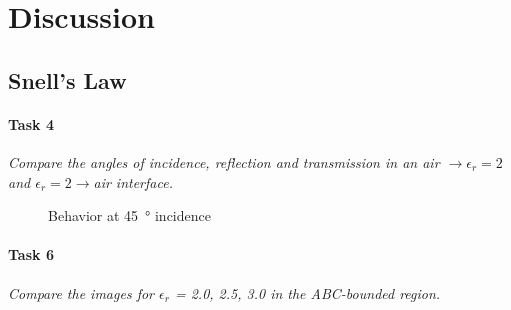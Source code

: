 \section{Discussion}\label{sec:discussion}
\subsection{Snell's Law}
\paragraph{Task 4}\textit{Compare the angles of incidence, reflection and transmission in an air $\rightarrow \epsilon_r = 2$ and $\epsilon_r = 2 \rightarrow $air interface.}
\begin{figure}[htpb]
	\caption{Behavior at \SI{45}{\degree} incidence}
	\label{fig:snell}
\end{figure}


\paragraph{Task 6}\textit{Compare the images for $\epsilon_r$ = 2.0, 2.5, 3.0 in the ABC-bounded region.}

